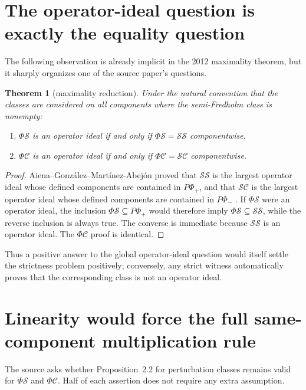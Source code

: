 \documentclass[11pt]{article}
\newtheorem{theorem}{Theorem}[section]
\theoremstyle{definition}
\newcommand{\SSing}{\mathcal{SS}}
\newcommand{\SCos}{\mathcal{SC}}
\newcommand{\PhiS}{\Phi\mathcal S}
\newcommand{\PhiC}{\Phi\mathcal C}
\newcommand{\PPhiP}{P\Phi_+}
\newcommand{\PPhiM}{P\Phi_-}
\begin{document}
\section{The operator-ideal question is exactly the equality question}

The following observation is already implicit in the 2012 maximality theorem, but it
sharply organizes one of the source paper's questions.

\begin{theorem}[maximality reduction]\label{thm:ideal}
Under the natural convention that the classes are considered on all components where the
semi-Fredholm class is nonempty:
\begin{enumerate}[label=\rm(\roman*)]
\item \(\PhiS\) is an operator ideal if and only if \(\PhiS=\SSing\) componentwise.
\item \(\PhiC\) is an operator ideal if and only if \(\PhiC=\SCos\) componentwise.
\end{enumerate}
\end{theorem}

\begin{proof}
Aiena--Gonz\'alez--Mart\'inez-Abej\'on proved that \(\SSing\) is the largest operator
ideal whose defined components are contained in \(\PPhiP\), and that \(\SCos\) is the
largest operator ideal whose defined components are contained in \(\PPhiM\)
\cite[Propositions~3.5 and 3.8]{Aiena2012}.  If \(\PhiS\) were an operator ideal, the
inclusion \(\PhiS\subseteq\PPhiP\) would therefore imply
\(\PhiS\subseteq\SSing\), while the reverse inclusion is always true.  The converse is
immediate because \(\SSing\) is an operator ideal.  The \(\PhiC\) proof is identical.
\end{proof}

Thus a positive answer to the global operator-ideal question would itself settle the
strictness problem positively; conversely, any strict witness automatically proves that the
corresponding class is not an operator ideal.

\section{Linearity would force the full same-component multiplication rule}

The source asks whether Proposition~2.2 for perturbation classes remains valid for
\(\PhiS\) and \(\PhiC\).  Half of each assertion does not require any extra assumption.
\end{document}
